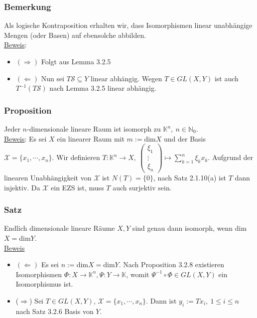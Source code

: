 \subsubsection{Bemerkung}
Als logische Kontraposition erhalten wir, dass Isomorphismen linear unabhängige Mengen (oder Basen) auf ebensolche abbilden.\\
\underline{Beweis}:
\begin{itemize}
\item $(\Rightarrow )$ Folgt aus Lemma 3.2.5
\item $(\Leftarrow )$ Nun sei $T\mathcal{S}\subseteq Y$ linear abhängig.  Wegen $T\in GL(X,Y)$ ist auch $T^{-1}(T\mathcal{S})$ nach Lemma 3.2.5 linear abhängig.
\end{itemize}
\subsubsection{Proposition}
Jeder $n$-dimensionale lineare Raum ist isomorph zu $\mathbb{K}^n,\ n\in\mathbb{N}_0$.\\
\underline{Beweis}: Es sei $X$ ein linearer Raum mit $m:=$dim$X$ und der Basis $\mathcal{X}=\{x_1,\cdots ,x_n\}$.  Wir definieren $T:\mathbb{K}^n\rightarrow X,\ \begin{pmatrix}\xi _1\\ \vdots \\ \xi _n\end{pmatrix}\mapsto \sum_{k=1}^n\xi _k x_k$.  Aufgrund der linearen Unabhängigkeit von $\mathcal{X}$ ist $N(T)=\{0\}$, nach Satz 2.1.10(a) ist $T$ dann injektiv.  Da $\mathcal{X}$ ein EZS ist, muss $T$ auch surjektiv sein.
\subsubsection{Satz}
Endlich dimensionale lineare Räume $X,Y$ sind genau dann isomorph, wenn dim$X=$dim$Y$.\\
\underline{Beweis}
\begin{itemize}
\item $(\Leftarrow )$ Es sei $n:=$dim$X=$dim$Y$.  Nach Proposition 3.2.8 existieren Isomorphismen $\Phi :X\rightarrow\mathbb{K}^n,\Psi :Y\rightarrow \mathbb{K}$, womit $\Psi ^{-1} \circ \Phi \in GL(X,Y)$ ein Isomorphismus ist.
\item ($\Rightarrow$) Sei $T\in GL(X,Y)$, $\mathcal{X}=\{x_1,\cdots ,x_n\}$.  Dann ist $y_i:=Tx_i,\ 1\leq i\leq n$ nach Satz 3.2.6 Basis von $Y$.
\end{itemize}
